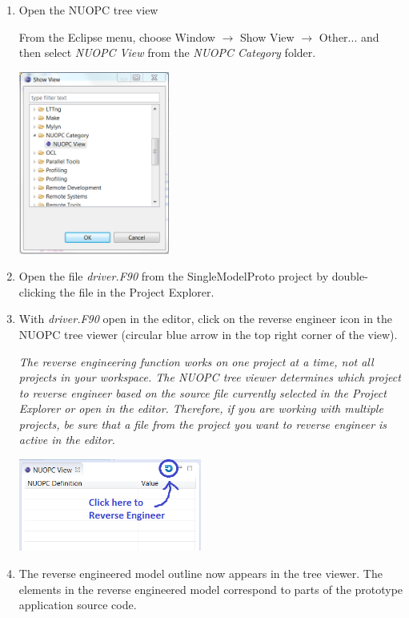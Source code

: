 \documentclass[oneside,11pt]{memoir}
\begin{document}
\begin{enumerate}
\item Open the NUOPC tree view

From the Eclipse menu, choose Window $\rightarrow$ Show View $\rightarrow$ Other... and then select \emph{NUOPC View} from the \emph{NUOPC Category} folder.

\parbox{\linewidth}{\centering
  \includegraphics[height=6cm]{figs/reveng_fig1.png}
}

\item Open the file \emph{driver.F90} from the SingleModelProto project by double-clicking the file in the Project Explorer.

\item With \emph{driver.F90} open in the editor, click on the reverse engineer icon in the NUOPC tree viewer (circular blue arrow in the top right corner of the view).  

\textit{The reverse engineering function works on one project at a time, not all projects in your workspace. The NUOPC tree viewer determines which project to reverse engineer based on the source file currently selected in the Project Explorer or open in the editor.  Therefore, if you are working with multiple projects, be sure that a file from the project you want to reverse engineer is active in the editor.}

\parbox{\linewidth}{\centering
  \includegraphics[width=6cm]{figs/reveng_fig2.png}
}

\item The reverse engineered model outline now appears in the tree viewer.  The elements in the reverse engineered model correspond to parts of the prototype application source code.


\end{enumerate}
\end{document}

